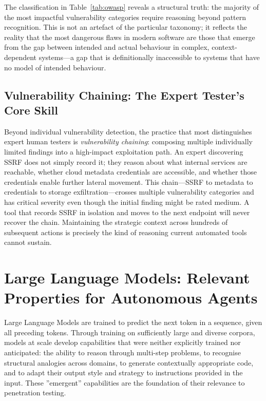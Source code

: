\documentclass[12pt,a4paper,oneside,openany]{book}
\newcommand{\term}[1]{\textit{#1}}
\begin{document}
The classification in Table~\ref{tab:owasp} reveals a structural truth: the majority of the most impactful vulnerability categories require reasoning beyond pattern recognition. This is not an artefact of the particular taxonomy; it reflects the reality that the most dangerous flaws in modern software are those that emerge from the gap between intended and actual behaviour in complex, context-dependent systems---a gap that is definitionally inaccessible to systems that have no model of intended behaviour.

\subsection{Vulnerability Chaining: The Expert Tester's Core Skill}

Beyond individual vulnerability detection, the practice that most distinguishes expert human testers is \term{vulnerability chaining}: composing multiple individually limited findings into a high-impact exploitation path. An expert discovering SSRF does not simply record it; they reason about what internal services are reachable, whether cloud metadata credentials are accessible, and whether those credentials enable further lateral movement. This chain---SSRF to metadata to credentials to storage exfiltration---crosses multiple vulnerability categories and has critical severity even though the initial finding might be rated medium. A tool that records SSRF in isolation and moves to the next endpoint will never recover the chain. Maintaining the strategic context across hundreds of subsequent actions is precisely the kind of reasoning current automated tools cannot sustain.

\section{Large Language Models: Relevant Properties for Autonomous Agents}

Large Language Models are trained to predict the next token in a sequence, given all preceding tokens. Through training on sufficiently large and diverse corpora, models at scale develop capabilities that were neither explicitly trained nor anticipated: the ability to reason through multi-step problems, to recognise structural analogies across domains, to generate contextually appropriate code, and to adapt their output style and strategy to instructions provided in the input. These ''emergent'' capabilities are the foundation of their relevance to penetration testing.
\end{document}
